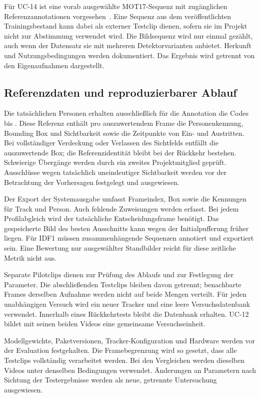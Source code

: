 \documentclass[runningheads]{llncs}
\begin{document}
Für UC-14 ist eine vorab ausgewählte MOT17-Sequenz mit zugänglichen Referenzannotationen vorgesehen~\cite{mot17-data}. Eine Sequenz aus dem veröffentlichten Trainingsbestand kann dabei als externer Testclip dienen, sofern sie im Projekt nicht zur Abstimmung verwendet wird. Die Bildsequenz wird nur einmal gezählt, auch wenn der Datensatz sie mit mehreren Detektorvarianten anbietet. Herkunft und Nutzungsbedingungen werden dokumentiert. Das Ergebnis wird getrennt von den Eigenaufnahmen dargestellt.

\subsection{Referenzdaten und reproduzierbarer Ablauf}

Die tatsächlichen Personen erhalten ausschlie{\ss}lich für die Annotation die Codes  bis . Diese Referenz enthält pro auszuwertendem Frame die Personenkennung, Bounding Box und Sichtbarkeit sowie die Zeitpunkte von Ein- und Austritten. Bei vollständiger Verdeckung oder Verlassen des Sichtfelds entfällt die auszuwertende Box; die Referenzidentität bleibt bei der Rückkehr bestehen. Schwierige Übergänge werden durch ein zweites Projektmitglied geprüft. Ausschlüsse wegen tatsächlich uneindeutiger Sichtbarkeit werden vor der Betrachtung der Vorhersagen festgelegt und ausgewiesen.

Der Export der Systemausgabe umfasst Frameindex, Box sowie die Kennungen für Track und Person. Auch fehlende Zuweisungen werden erfasst. Bei jedem Profilabgleich wird der tatsächliche Entscheidungsframe benötigt. Das gespeicherte Bild des besten Ausschnitts kann wegen der Initialpufferung früher liegen. Für IDF1 müssen zusammenhängende Sequenzen annotiert und exportiert sein. Eine Bewertung nur ausgewählter Standbilder reicht für diese zeitliche Metrik nicht aus.

Separate Pilotclips dienen zur Prüfung des Ablaufs und zur Festlegung der Parameter. Die abschlie{\ss}enden Testclips bleiben davon getrennt; benachbarte Frames derselben Aufnahme werden nicht auf beide Mengen verteilt. Für jeden unabhängigen Versuch wird ein neuer Tracker und eine leere Versuchsdatenbank verwendet. Innerhalb eines Rückkehrtests bleibt die Datenbank erhalten. UC-12 bildet mit seinen beiden Videos eine gemeinsame Versuchseinheit.

Modellgewichte, Paketversionen, Tracker-Konfiguration und Hardware werden vor der Evaluation festgehalten. Die Framebegrenzung wird so gesetzt, dass alle Testclips vollständig verarbeitet werden. Bei den Vergleichen werden dieselben Videos unter denselben Bedingungen verwendet. Änderungen an Parametern nach Sichtung der Testergebnisse werden als neue, getrennte Untersuchung ausgewiesen.
\end{document}
